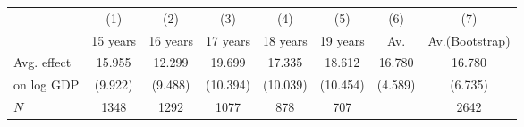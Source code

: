 \begin{tabular}{l*{7}{c}}
\hline\hline
            &\multicolumn{1}{c}{(1)}&\multicolumn{1}{c}{(2)}&\multicolumn{1}{c}{(3)}&\multicolumn{1}{c}{(4)}&\multicolumn{1}{c}{(5)}&\multicolumn{1}{c}{(6)}&\multicolumn{1}{c}{(7)}\\
            &    15 years&    16 years&    17 years&    18 years&    19 years&         Av.&Av.(Bootstrap)\\
\hline
Avg. effect &      15.955&      12.299&      19.699&      17.335&      18.612&      16.780&      16.780\\
on log GDP  &     (9.922)&     (9.488)&    (10.394)&    (10.039)&    (10.454)&     (4.589)&     (6.735)\\
\hline
\(N\)       &        1348&        1292&        1077&         878&         707&            &        2642\\
\hline\hline
\end{tabular}
